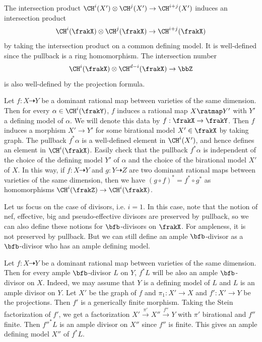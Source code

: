   The intersection product $\CH^i(X') \otimes \CH^j(X') \to \CH^{i+j}(X')$ induces an intersection product
  \[ \CH^i(\frakX) \otimes \CH^j(\frakX) \to \CH^{i+j}(\frakX) \]
  by taking the intersection product on a common defining model.
  It is well-defined since the pullback is a ring homomorphism.
  The intersection number 
  \[ \CH^i(\frakX) \otimes \CH^{d-i}(\frakX) \to \bbZ \]
  is also well-defined by the projection formula.

  Let $f: X \dashrightarrow Y$ be a dominant rational map between varieties of the same dimension.
  Then for every $\alpha \in \CH^i(\frakY)$, $f$ induces a rational map $X \ratmap Y'$ with $Y'$ a defining model of $\alpha$.
  We will denote this data by $f: \frakX \to \frakY$.
  Then $f$ induces a morphism $X' \to Y'$ for some birational model $X' \in \frakX$ by taking graph.
  The pullback $f^* \alpha$ is a well-defined element in $\CH^i(X')$, and hence defines an element in $\CH^i(\frakX)$.
  Easily check that the pullback $f^* \alpha$ is independent of the choice of the defining model $Y'$ of $\alpha$ and the choice of the birational model $X'$ of $X$.
  In this way, if $f: X \dashrightarrow Y$ and $g: Y \dashrightarrow Z$ are two dominant rational maps between varieties of the same dimension, then we have $(g \circ f)^* = f^* \circ g^*$ as homomorphisms $\CH^i(\frakZ) \to \CH^i(\frakX)$.

  Let us focus on the case of divisors, i.e. $i=1$.
  In this case, note that the notion of nef, effective, big and pseudo-effective divisors are preserved by pullback, so we can also define these notions for $\bfb$-divisors on $\frakX$.
  For ampleness, it is not preserved by pullback.
  But we can still define an ample $\bfb$-divisor as a $\bfb$-divisor who has an ample defining model.
  
  Let $f: X \dashrightarrow Y$ be a dominant rational map between varieties of the same dimension.
  Then for every ample $\bfb$-divisor $L$ on $Y$, $f^* L$ will be also an ample $\bfb$-divisor on $X$.
  Indeed, we may assume that $Y$ is a defining model of $L$ and $L$ is an ample divisor on $Y$.
  Let $X'$ be the graph of $f$ and $\pi_1: X' \to X$ and $f': X' \to Y$ be the projections.
  Then $f'$ is a generically finite morphism.
  Taking the Stein factorization of $f'$, we get a factorization $X' \xrightarrow{\pi'} X'' \xrightarrow{f''} Y$ with $\pi'$ birational and $f''$ finite.
  Then $f''^* L$ is an ample divisor on $X''$ since $f''$ is finite.
  This gives an ample defining model $X''$ of $f^* L$.


